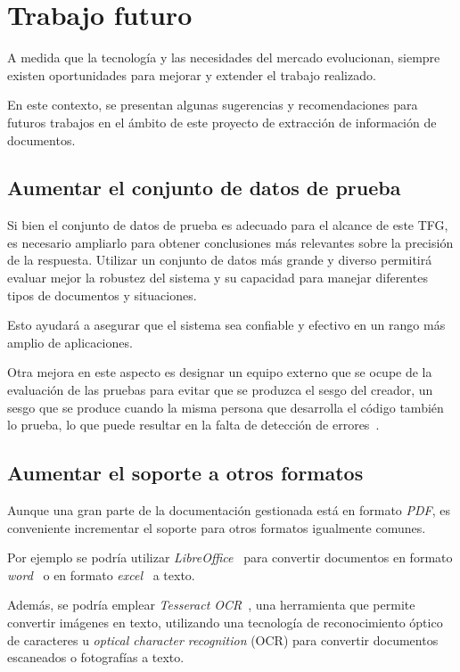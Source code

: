 \section{Trabajo futuro}

A medida que la tecnología y las necesidades del mercado evolucionan, siempre existen oportunidades para mejorar y
extender el trabajo realizado.

En este contexto, se presentan algunas sugerencias y recomendaciones para futuros trabajos en el ámbito de este proyecto
de extracción de información de documentos.

\subsection*{Aumentar el conjunto de datos de prueba}

Si bien el conjunto de datos de prueba es adecuado para el alcance de este TFG, es necesario ampliarlo para obtener
conclusiones más relevantes sobre la precisión de la respuesta.
Utilizar un conjunto de datos más grande y diverso permitirá evaluar mejor la robustez del sistema y su capacidad para
manejar diferentes tipos de documentos y situaciones.

Esto ayudará a asegurar que el sistema sea confiable y efectivo en un rango más amplio de aplicaciones.

Otra mejora en este aspecto es designar un equipo externo que se ocupe de la evaluación de las pruebas para evitar que
se produzca el sesgo del creador, un sesgo que se produce cuando la misma persona que desarrolla el código también lo
prueba, lo que puede resultar en la falta de detección de errores~\cite{url_test_io_bias_software_testing}.

\subsection*{Aumentar el soporte a otros formatos}

Aunque una gran parte de la documentación gestionada está en formato \textit{PDF}, es conveniente incrementar el soporte
para otros formatos igualmente comunes.

Por ejemplo se podría utilizar \textit{LibreOffice}~\cite{url_libreoffice} para convertir documentos en formato
\textit{word}~\cite{url_microsoft_word} o en formato \textit{excel}~\cite{url_microsoft_excel} a texto.

Además, se podría emplear \textit{Tesseract OCR}~\cite{url_tesseract}, una herramienta que permite convertir
imágenes en texto, utilizando una tecnología de reconocimiento óptico de caracteres u
\textit{optical character recognition} (OCR) para convertir documentos escaneados o fotografías a texto.

